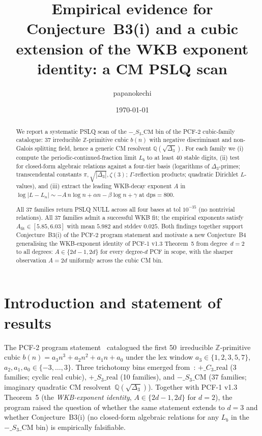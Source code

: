 \documentclass[11pt,reqno]{amsart}
\title[Empirical evidence for Conjecture B3(i) and a cubic WKB extension]
{Empirical evidence for Conjecture~B3(i) and a cubic extension of the WKB
exponent identity: a CM PSLQ scan}
\author{papanokechi}
\date{\today}
\theoremstyle{definition}
\newcommand{\Q}{\mathbb{Q}}
\newcommand{\Z}{\mathbb{Z}}
\newcommand{\dps}{\mathrm{dps}}
\begin{document}
\maketitle

\begin{abstract}
We report a systematic PSLQ scan of the $-\_S_3\_\mathrm{CM}$ bin of the
PCF-2 cubic-family catalogue: 37 irreducible $\Z$-primitive cubic
$b(n)$ with negative discriminant and non-Galois splitting field, hence
a generic CM resolvent $\Q(\sqrt{\Delta_3})$. For each family we
(i) compute the periodic-continued-fraction limit $L_b$ to at least 40
stable digits, (ii) test for closed-form algebraic relations against a
four-tier basis (logarithms of $\Delta_3$-primes; transcendental
constants $\pi, \sqrt{|\Delta_3|}, \zeta(3)$;
$\Gamma$-reflection products; quadratic Dirichlet $L$-values), and
(iii) extract the leading WKB-decay exponent
$A$ in $\log|L - L_n| \sim -A\, n\log n + \alpha n - \beta\log n + \gamma$
at $\dps=800$.

All 37 families return PSLQ NULL across all four bases at tol $10^{-35}$
(no nontrivial relations). All 37 families admit a successful WKB fit;
the empirical exponents satisfy $A_{\mathrm{fit}}\in[5.85, 6.03]$ with
mean $5.982$ and stddev $0.025$. Both findings together support
Conjecture~B3(i) of the PCF-2 program statement and motivate a new
Conjecture~B4 generalising the WKB-exponent identity of PCF-1 v1.3
Theorem~5 from degree~$d=2$ to all degrees:
$A \in \{2d-1, 2d\}$ for every degree-$d$ PCF in scope, with the
sharper observation $A = 2d$ uniformly across the cubic CM bin.
\end{abstract}

\section{Introduction and statement of results}

The PCF-2 program statement~\cite{pcf2v1} catalogued the first
50~irreducible $\Z$-primitive cubic $b(n) = a_3 n^3 + a_2 n^2 + a_1 n + a_0$
under the lex window $a_3\in\{1,2,3,5,7\}$, $a_2,a_1,a_0\in\{-3,\ldots,3\}$.
Three trichotomy bins emerged from~\cite[Conjecture B3]{pcf2v1}:
$+\_C_3\_\mathrm{real}$ (3 families; cyclic real cubic),
$+\_S_3\_\mathrm{real}$ (10 families), and $-\_S_3\_\mathrm{CM}$ (37 families;
imaginary quadratic CM resolvent~$\Q(\sqrt{\Delta_3})$). Together with
PCF-1 v1.3 Theorem~5 (the \emph{WKB-exponent identity},
$A\in\{2d-1, 2d\}$ for $d=2$), the program raised the question of
whether the same statement extends to $d=3$ and whether
Conjecture~B3(i) (no closed-form algebraic relations for any $L_b$ in
the $-\_S_3\_\mathrm{CM}$ bin) is empirically falsifiable.
\end{document}
